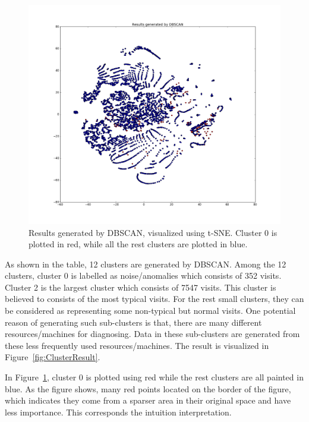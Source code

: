 \begin{figure}[!ht]
	\begin{center}
		\includegraphics[width=\textwidth]{images/ClusterResult2}
		\caption{Results generated by DBSCAN, visualized using t-SNE. Cluster 0 is plotted in red, while all the rest clusters are plotted in blue.}
		\label{fig:ClusterResult2}
	\end{center}
\end{figure}

As shown in the table, 12 clusters are generated by DBSCAN. Among the 12 clusters, cluster 0 is labelled as noise/anomalies which consists of 352 visits. Cluster 2 is the largest cluster which consists of 7547 visits. This cluster is believed to consists of the most typical visits. For the rest small clusters, they can be considered as representing some non-typical but normal visits. One potential reason of generating such sub-clusters is that, there are many different resources/machines for diagnosing. Data in these sub-clusters are generated from these less frequently used resources/machines. The result is visualized in Figure~\ref{fig:ClusterResult}.

In Figure~\ref{fig:ClusterResult2}, cluster 0 is plotted using red while the rest clusters are all painted in blue. As the figure shows, many red points located on the border of the figure, which indicates they come from a sparser area in their original space and have less importance. This corresponds the intuition interpretation.

